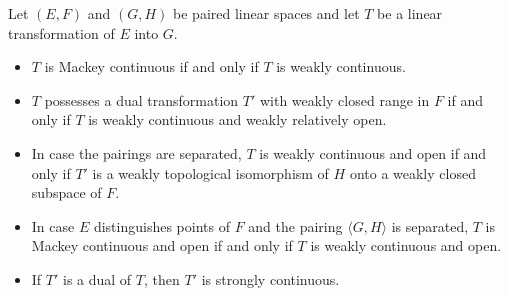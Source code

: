 \begin{theorem}
\label{thm:21.4}
Let $(E,F)$ and $(G,H)$ be paired linear spaces and let $T$ be a linear transformation of $E$ into $G$.

\begin{itemize}
\item[(i)] $T$ is Mackey continuous if and only if $T$ is weakly continuous.

\item[(ii)] $T$ possesses a dual transformation $T'$ with weakly closed range in $F$ if and only if $T$ is weakly continuous and weakly relatively open.

\item[(iii)] In case the pairings are separated, $T$ is weakly continuous and open if and only if $T'$ is a weakly topological isomorphism of $H$ onto a weakly closed subspace of $F$.

\item[(iv)] In case $E$ distinguishes points of $F$ and the pairing $\langle G,H\rangle$ is separated, $T$ is Mackey continuous and open if and only if $T$ is weakly continuous and open.

\item[(v)] If $T'$ is a dual of $T$, then $T'$ is strongly continuous.
\end{itemize}
\end{theorem}
